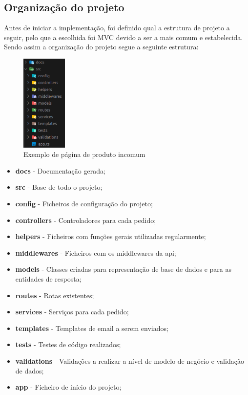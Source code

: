 \subsection{Organização do projeto}
Antes de iniciar a implementação, foi definido qual a estrutura de projeto a seguir, pelo que a escolhida foi MVC devido a ser a mais comum e estabelecida. Sendo assim a organização do projeto segue a seguinte estrutura:
\begin{figure}[htb]
  \centering
  \includegraphics[width=0.2\textwidth]{images/implementacao/api/project_organization.png}
  \caption{Exemplo de página de produto incomum}
  \label{fig:63}
\end{figure}

\begin{itemize}
  \item \textbf{docs} - Documentação gerada;
  \item \textbf{src} - Base de todo o projeto;
  \item \textbf{config} - Ficheiros de configuração do projeto;
  \item \textbf{controllers} - Controladores para cada pedido;
  \item \textbf{helpers} - Ficheiros com funções gerais utilizadas regularmente;
  \item \textbf{middlewares} - Ficheiros com os middlewares da api;
  \item \textbf{models} - Classes criadas para representação de base de dados e para as entidades de resposta;
  \item \textbf{routes} - Rotas existentes;
  \item \textbf{services} - Serviços para cada pedido;
  \item \textbf{templates} - Templates de email a serem enviados;
  \item \textbf{tests} - Testes de código realizados;
  \item \textbf{validations} - Validações a realizar a nível de modelo de negócio e validação de dados;
  \item \textbf{app} - Ficheiro de início do projeto;
\end{itemize}